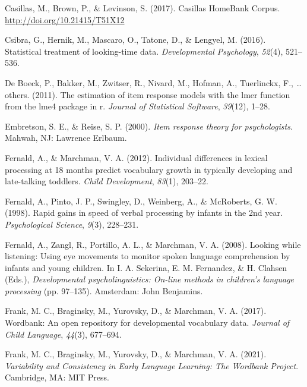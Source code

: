 \documentclass[10pt, letterpaper]{article}
\begin{document}
\leavevmode\hypertarget{ref-Casillas2017}{}%
Casillas, M., Brown, P., \& Levinson, S. (2017). Casillas HomeBank
Corpus. \url{http://doi.org/10.21415/T51X12}

\leavevmode\hypertarget{ref-Csibra2016}{}%
Csibra, G., Hernik, M., Mascaro, O., Tatone, D., \& Lengyel, M. (2016).
Statistical treatment of looking-time data. \emph{Developmental
Psychology}, \emph{52}(4), 521--536.

\leavevmode\hypertarget{ref-de-boeck2011}{}%
De Boeck, P., Bakker, M., Zwitser, R., Nivard, M., Hofman, A.,
Tuerlinckx, F., \ldots{} others. (2011). The estimation of item response
models with the lmer function from the lme4 package in r. \emph{Journal
of Statistical Software}, \emph{39}(12), 1--28.

\leavevmode\hypertarget{ref-embretson2000}{}%
Embretson, S. E., \& Reise, S. P. (2000). \emph{Item response theory for
psychologists}. Mahwah, NJ: Lawrence Erlbaum.

\leavevmode\hypertarget{ref-Fernald2012a}{}%
Fernald, A., \& Marchman, V. A. (2012). Individual differences in
lexical processing at 18 months predict vocabulary growth in typically
developing and late-talking toddlers. \emph{Child Development},
\emph{83}(1), 203--22.

\leavevmode\hypertarget{ref-fernald1998}{}%
Fernald, A., Pinto, J. P., Swingley, D., Weinberg, A., \& McRoberts, G.
W. (1998). Rapid gains in speed of verbal processing by infants in the
2nd year. \emph{Psychological Science}, \emph{9}(3), 228--231.

\leavevmode\hypertarget{ref-Fernald2008}{}%
Fernald, A., Zangl, R., Portillo, A. L., \& Marchman, V. A. (2008).
Looking while listening: Using eye movements to monitor spoken language
comprehension by infants and young children. In I. A. Sekerina, E. M.
Fernandez, \& H. Clahsen (Eds.), \emph{Developmental psycholinguistics:
On-line methods in children's language processing} (pp. 97--135).
Amsterdam: John Benjamins.

\leavevmode\hypertarget{ref-Frank2016}{}%
Frank, M. C., Braginsky, M., Yurovsky, D., \& Marchman, V. A. (2017).
Wordbank: An open repository for developmental vocabulary data.
\emph{Journal of Child Language}, \emph{44}(3), 677--694.

\leavevmode\hypertarget{ref-frank2021}{}%
Frank, M. C., Braginsky, M., Yurovsky, D., \& Marchman, V. A. (2021).
\emph{Variability and Consistency in Early Language Learning: The
Wordbank Project}. Cambridge, MA: MIT Press.
\end{document}
